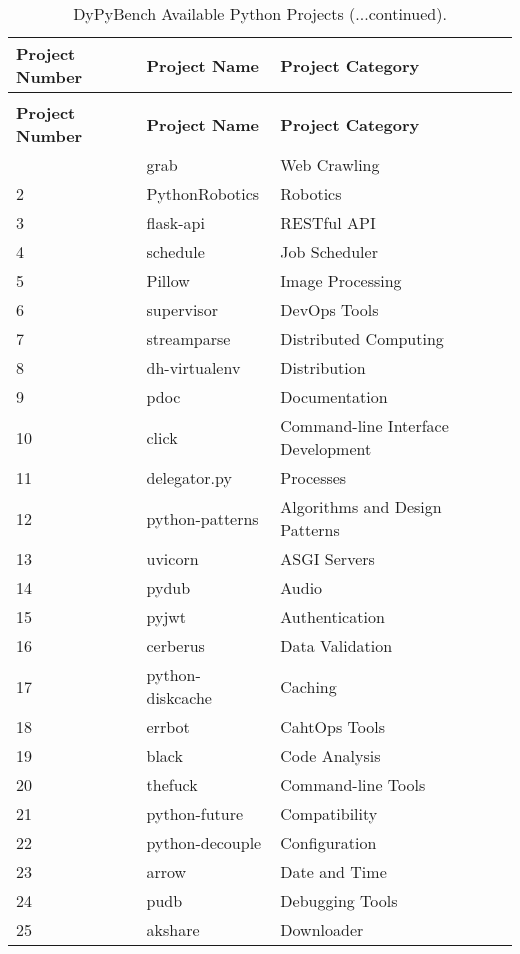 \centering
\begin{longtable} {|l|l|l|}
    \caption[DyPyBench Available Python Projects]{DyPyBench Available Python Projects. \label{table:50_installed_projects}}\\
    \hline
    \textbf{Project Number} & \textbf{Project Name} & \textbf{Project Category}\\
    \hline
    \endfirsthead
    \caption[]{DyPyBench Available Python Projects (...continued).}\\
    \hline
    \textbf{Project Number} & \textbf{Project Name} & \textbf{Project Category}\\
    \hline
    \endhead
    \hline
    \endfoot
    1 & grab & Web Crawling\\
    2 & PythonRobotics & Robotics\\
    3 & flask-api & RESTful API\\
    4 & schedule & Job Scheduler\\
    5 & Pillow & Image Processing\\
    6 & supervisor & DevOps Tools\\
    7 & streamparse & Distributed Computing\\
    8 & dh-virtualenv & Distribution\\
    9 & pdoc & Documentation\\
    10 & click & Command-line Interface Development\\
    11 & delegator.py & Processes\\
    12 & python-patterns & Algorithms and Design Patterns\\
    13 & uvicorn & ASGI Servers\\
    14 & pydub & Audio\\
    15 & pyjwt & Authentication\\
    16 & cerberus & Data Validation\\
    17 & python-diskcache & Caching\\
    18 & errbot & CahtOps Tools\\
    19 & black & Code Analysis\\
    20 & thefuck & Command-line Tools\\
    21 & python-future & Compatibility\\
    22 & python-decouple & Configuration\\
    23 & arrow & Date and Time\\
    24 & pudb & Debugging Tools\\
    25 & akshare & Downloader\\

\end{longtable}
